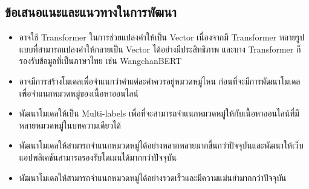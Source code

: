 \documentclass[12pt,oneside,openright,a4paper]{cpe-thai-project}
\begin{document}
  \subsection{ข้อเสนอแนะและแนวทางในการพัฒนา}
    \begin{itemize}
      \item อาจใช้ Transformer ในการช่วยแปลงคำให้เป็น Vector เนื่องจากมี Transformer หลายรูปแบบที่สามารถแปลงคำให้กลายเป็น Vector ได้อย่างมีประสิทธิภาพ
            และบาง Transformer ก็รองรับข้อมูลที่เป็นภาษาไทย เช่น WangchanBERT
      \item อาจมีการสร้างโมเดลเพื่อจำแนกว่าคำแต่ละคำควรอยู่หมวดหมู่ไหน ก่อนที่จะมีการพัฒนาโมเดลเพื่อจำแนกหมวดหมู่ของเนื้อหาออนไลน์
      \item พัฒนาโมเดลให้เป็น Multi-labels เพื่อที่จะสามารถจำแนกหมวดหมู่ให้กับเนื้อหาออนไลน์ที่มีหลายหมวดหมู่ในบทความเดียวได้
      \item พัฒนาโมเดลให้สามารถจำแนกหมวดหมู่ได้อย่างหลากหลายมากขึ้นกว่าปัจจุบันและพัฒนาให้เว็บแอปพลิเคชันสามารถรองรับโดเมนได้มากกว่าปัจจุบัน
      \item พัฒนาโมเดลให้สามารถจำแนกหมวดหมู่ได้อย่างรวดเร็วและมีความแม่นยำมากกว่าปัจจุบัน
    \end{itemize}




\makeatletter
\g@addto@macro{\UrlBreaks}{\UrlOrds}
\makeatother





\end{document}
